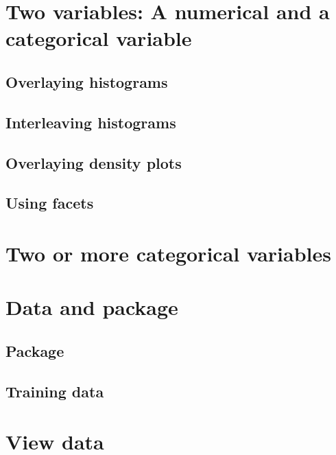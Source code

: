 \documentclass[]{book}
\theoremstyle{definition}
\theoremstyle{definition}
\theoremstyle{definition}
\theoremstyle{remark}
\begin{document}
\section{Two variables: A numerical and a categorical
variable}\label{two-variables-a-numerical-and-a-categorical-variable}

\subsection{Overlaying histograms}\label{overlaying-histograms}

\subsection{Interleaving histograms}\label{interleaving-histograms}

\subsection{Overlaying density plots}\label{overlaying-density-plots}

\subsection{Using facets}\label{using-facets}

\section{Two or more categorical
variables}\label{two-or-more-categorical-variables}

\section{Data and package}\label{data-and-package}

\subsection{Package}\label{package}

\subsection{Training data}\label{training-data-1}

\section{View data}\label{view-data}
\end{document}

